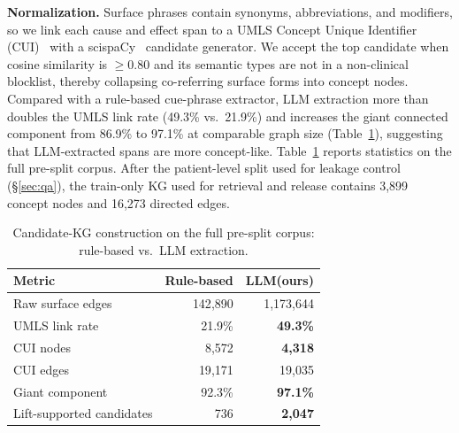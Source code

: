 \documentclass[runningheads]{llncs}
\begin{document}
\noindent\textbf{Normalization.} %
Surface phrases contain synonyms, abbreviations, and modifiers, so we link each cause and effect span to a UMLS Concept Unique Identifier (CUI)~\cite{bodenreider2004umls} with a scispaCy~\cite{neumann2019scispacy} candidate generator. We accept the top candidate when cosine similarity is $\geq0.80$ and its semantic types are not in a non-clinical blocklist, thereby collapsing co-referring surface forms into concept nodes. Compared with a rule-based cue-phrase extractor, LLM extraction more than doubles the UMLS link rate (49.3\% vs.\ 21.9\%) and increases the giant connected component from 86.9\% to 97.1\% at comparable graph size (Table~\ref{tab:kg}), suggesting that LLM-extracted spans are more concept-like. Table~\ref{tab:kg} reports statistics on the full pre-split corpus. After the patient-level split used for leakage control (\S\ref{sec:qa}), the train-only KG used for retrieval and release contains 3{,}899 concept nodes and 16{,}273 directed edges.

\begin{table}[!htbp]\centering
\caption{Candidate-KG construction on the full pre-split corpus: rule-based vs.\ LLM extraction.}
\label{tab:kg}\footnotesize
\setlength{\tabcolsep}{4pt}
\begin{tabular}{lrr}\toprule
Metric & Rule-based & LLM(ours) \\\midrule
Raw surface edges & 142{,}890 & 1{,}173{,}644 \\
UMLS link rate & 21.9\% & \textbf{49.3\%} \\
CUI nodes & 8{,}572 & \textbf{4{,}318} \\
CUI edges & 19{,}171 & 19{,}035 \\
Giant component & 92.3\% & \textbf{97.1\%} \\
Lift-supported candidates & 736 & \textbf{2{,}047} \\\bottomrule
\end{tabular}\end{table}
\end{document}
